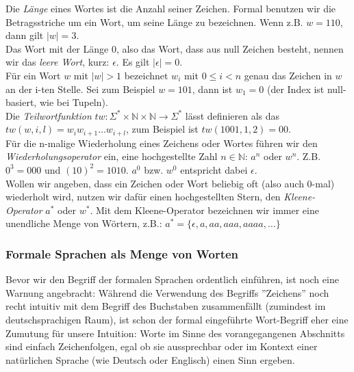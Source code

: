 \noindent
Die \emph{Länge} eines Wortes ist die Anzahl seiner Zeichen.
Formal benutzen wir die Betragsstriche um ein Wort, um seine
Länge zu bezeichnen. Wenn z.B. $w = 110$, dann gilt $|w| = 3$.\\

\noindent
Das Wort mit der Länge 0, also das Wort, dass aus null Zeichen besteht,
nennen wir das \emph{leere Wort}, kurz: $\epsilon$.
Es gilt $|\epsilon| = 0$.\\

\noindent
Für ein Wort $w$ mit $|w| > 1$ bezeichnet $w_i$ mit $0 \leq i < n$
genau das Zeichen in $w$ an der i-ten Stelle.
Sei zum Beispiel $w = 101$, dann ist $w_1 = 0$
(der Index ist null-basiert, wie bei Tupeln).\\

\noindent
Die \emph{Teilwortfunktion}
$tw: \Sigma^* \times \mathbb{N} \times \mathbb{N} \rightarrow \Sigma^*$
lässt definieren als das $tw(w, i, l) = w_iw_{i+1}\ldots{}w_{i+l}$,
zum Beispiel ist $tw(1001, 1, 2) = 00$.\\

\noindent
Für die n-malige Wiederholung eines Zeichens oder Wortes führen wir den \emph{Wiederholungsoperator}
ein, eine hochgestellte Zahl $n \in \mathbb{N}$: $a^n$ oder $w^n$.
Z.B. $0^3 = 000$ und $(10)^2 = 1010$.
$a^0$ bzw. $w^0$ entspricht dabei $\epsilon$.\\

\noindent
Wollen wir angeben, dass ein Zeichen oder Wort beliebig oft (also auch 0-mal) wiederholt
wird, nutzen wir dafür einen hochgestellten Stern, den \emph{Kleene-Operator} $a^*$ oder $w^*$.
Mit dem Kleene-Operator bezeichnen wir immer eine unendliche Menge von Wörtern, z.B.:
$a^* = \{\epsilon, a, aa, aaa, aaaa, \dots\}$

\subsubsection{Formale Sprachen als Menge von Worten}

Bevor wir den Begriff der formalen Sprachen ordentlich einführen,
ist noch eine Warnung angebracht:
Während die Verwendung des Begriffs ''Zeichens''
noch recht intuitiv mit dem Begriff des Buchstaben zusammenfällt
(zumindest im deutschsprachigen Raum),
ist schon der formal eingeführte Wort-Begriff eher eine Zumutung für unsere Intuition:
Worte im Sinne des vorangegangenen Abschnitts sind einfach Zeichenfolgen,
egal ob sie aussprechbar oder im Kontext einer natürlichen Sprache
(wie Deutsch oder Englisch) einen Sinn ergeben.

